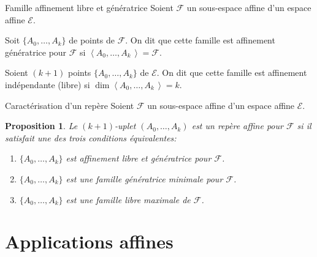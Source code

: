\documentclass[aspectratio=1610 %
]{beamer}
\newtheorem{proposition}[theorem]{Proposition}
\let\ens\mathcal
\begin{document}
  \begin{frame}{Famille affinement libre et génératrice}
    Soient $\ens{F}$ un sous-espace affine d'un espace affine $\ens{E}$.\pause
    \begin{definition}
      Soit $\{A_{0},\ldots,A_{k}\}$ de points de $\ens{F}$. On dit que cette famille est \alert{affinement génératrice} pour $\ens{F}$ si $\left<A_{0},\ldots,A_{k}\,\right>=\ens{F}$.
    \end{definition}\pause
    \begin{definition}
      Soient $(k+1)$ points $\{A_{0},\ldots,A_{k}\}$ de $\ens{E}$. On dit que cette famille est \alert{affinement indépendante (libre)} si $\dim\left<A_{0},\ldots,A_{k}\,\right>=k$.
    \end{definition}
  \end{frame}
  \begin{frame}{Caractérisation d'un repère}
    Soient $\ens{F}$ un sous-espace affine d'un espace affine $\ens{E}$.
    \begin{proposition}
      Le $(k+1)$-uplet $(A_{0},\ldots,A_{k})$ est un repère affine pour $\ens{F}$ si il satisfait une des trois conditions équivalentes:
      \begin{enumerate}[<+(1)->]
        \item $\{A_{0},\ldots,A_{k}\}$ est affinement libre et génératrice pour $\ens{F}$.
        \item $\{A_{0},\ldots,A_{k}\}$ est une famille génératrice minimale pour $\ens{F}$.
        \item $\{A_{0},\ldots,A_{k}\}$ est une famille libre maximale de $\ens{F}$.
      \end{enumerate}
    \end{proposition}
  \end{frame}
\section{Applications affines}
\end{document}
